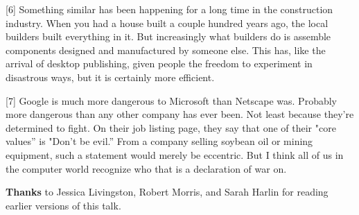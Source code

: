 [6]
                    Something similar has been happening for a long time in the
                    construction industry. When you had a house built a couple
                    hundred years ago, the local builders built everything in
                    it. But increasingly what builders do is assemble components
                    designed and manufactured by someone else. This has, like
                    the arrival of desktop publishing, given people the freedom
                    to experiment in disastrous ways, but it is certainly more
                    efficient.

[7] Google is much more dangerous to
                    Microsoft than Netscape was. Probably more dangerous than
                    any other company has ever been. Not least because they're
                    determined to fight. On their job listing page, they say
                    that one of their "core values'' is "Don't be evil.'' From a
                    company selling soybean oil or mining equipment, such a
                    statement would merely be eccentric. But I think all of us
                    in the computer world recognize who that is a declaration of
                    war on.

\textbf{Thanks} to Jessica Livingston,
                    Robert Morris, and Sarah Harlin for reading earlier versions
                    of this talk.



              
            
          

